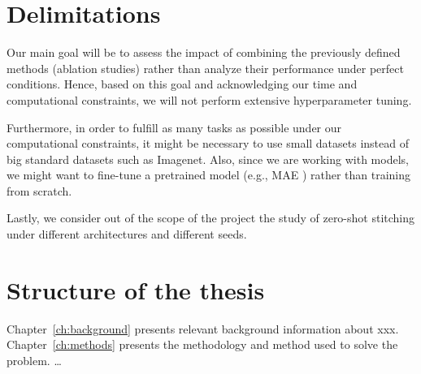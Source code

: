 \documentclass[../main.tex]{subfiles}
\begin{document}
\section{Delimitations}

Our main goal will be to assess the impact of combining the previously defined methods (ablation studies) rather than analyze their performance under perfect conditions. Hence, based on this goal and acknowledging our time and computational constraints, we will not perform extensive hyperparameter tuning. 


Furthermore, in order to fulfill as many tasks as possible under our computational constraints, it might be necessary to use small datasets instead of big standard datasets such as Imagenet. Also, since we are working with  models, we might want to fine-tune a pretrained model (e.g., MAE \cite{he_masked_2021}) rather than training from scratch.

Lastly, we consider out of the scope of the project the study of zero-shot stitching under different architectures and different seeds.


\section{Structure of the thesis}
Chapter~\ref{ch:background} presents relevant background information about xxx.  Chapter~\ref{ch:methods} presents the methodology and method used to solve the problem. …
\end{document}
